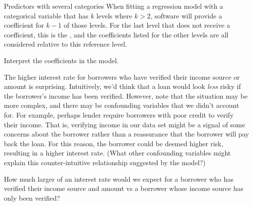 \begin{onebox}{Predictors with several categories}
When fitting a regression model with a categorical variable
that has $k$ levels where $k > 2$, software will provide
a coefficient for $k - 1$ of those levels.
For the last level that does not receive a coefficient,
this is the , and the coefficients
listed for the other levels are all considered relative
to this reference level.
\end{onebox}

\begin{exercisewrap}
\begin{nexercise}
Interpret the coefficients in the 
model.\footnotemark
\end{nexercise}
\end{exercisewrap}

The higher interest rate for borrowers who have verified
their income source or amount is surprising.
Intuitively, we'd think that a loan would look \emph{less}
risky if the borrower's income has been verified.
However, note that the situation may be more complex,
and there may be confounding variables
that we didn't account for.
For example, perhaps lender require borrowers with
poor credit to verify their income.
That is, verifying income in our data set might be
a signal of some concerns about the borrower
rather than a reassurance that the borrower will pay
back the loan.
For this reason, the borrower could be deemed higher
risk, resulting in a higher interest rate.
(What other confounding variables might explain this
counter-intuitive relationship suggested by the model?)

\begin{exercisewrap}
\begin{nexercise}
How much larger of an interest rate would we expect for
a borrower who has verified their income source and amount
vs a borrower whose income source has only been
verified?\footnotemark
\end{nexercise}
\end{exercisewrap}


